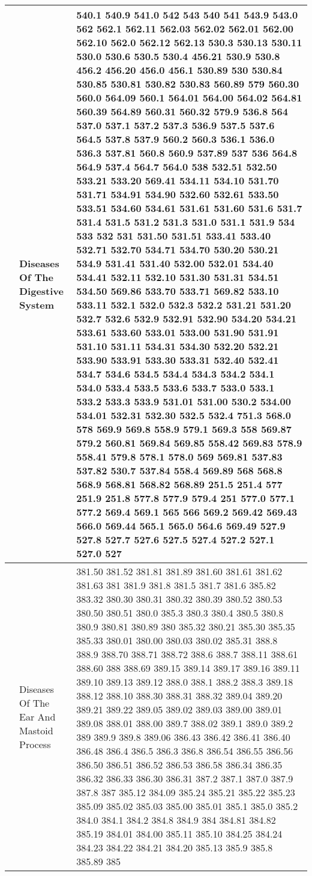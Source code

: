 \begin{longtable}{|R{.05in}|L{.65in}||L{5.65in}|}
    & Diseases Of The Digestive System &  540.1 540.9 541.0 542 543 540 541 543.9 543.0 562 562.1 562.11 562.03 562.02 562.01 562.00 562.10 562.0 562.12 562.13 530.3 530.13 530.11 530.0 530.6 530.5 530.4 456.21 530.9 530.8 456.2 456.20 456.0 456.1 530.89 530 530.84 530.85 530.81 530.82 530.83 560.89 579 560.30 560.0 564.09 560.1 564.01 564.00 564.02 564.81 560.39 564.89 560.31 560.32 579.9 536.8 564 537.0 537.1 537.2 537.3 536.9 537.5 537.6 564.5 537.8 537.9 560.2 560.3 536.1 536.0 536.3 537.81 560.8 560.9 537.89 537 536 564.8 564.9 537.4 564.7 564.0 538 532.51 532.50 533.21 533.20 569.41 534.11 534.10 531.70 531.71 534.91 534.90 532.60 532.61 533.50 533.51 534.60 534.61 531.61 531.60 531.6 531.7 531.4 531.5 531.2 531.3 531.0 531.1 531.9 534 533 532 531 531.50 531.51 533.41 533.40 532.71 532.70 534.71 534.70 530.20 530.21 534.9 531.41 531.40 532.00 532.01 534.40 534.41 532.11 532.10 531.30 531.31 534.51 534.50 569.86 533.70 533.71 569.82 533.10 533.11 532.1 532.0 532.3 532.2 531.21 531.20 532.7 532.6 532.9 532.91 532.90 534.20 534.21 533.61 533.60 533.01 533.00 531.90 531.91 531.10 531.11 534.31 534.30 532.20 532.21 533.90 533.91 533.30 533.31 532.40 532.41 534.7 534.6 534.5 534.4 534.3 534.2 534.1 534.0 533.4 533.5 533.6 533.7 533.0 533.1 533.2 533.3 533.9 531.01 531.00 530.2 534.00 534.01 532.31 532.30 532.5 532.4 751.3 568.0 578 569.9 569.8 558.9 579.1 569.3 558 569.87 579.2 560.81 569.84 569.85 558.42 569.83 578.9 558.41 579.8 578.1 578.0 569 569.81 537.83 537.82 530.7 537.84 558.4 569.89 568 568.8 568.9 568.81 568.82 568.89 251.5 251.4 577 251.9 251.8 577.8 577.9 579.4 251 577.0 577.1 577.2 569.4 569.1 565 566 569.2 569.42 569.43 566.0 569.44 565.1 565.0 564.6 569.49 527.9 527.8 527.7 527.6 527.5 527.4 527.2 527.1 527.0 527\\\hline
    & Diseases Of The Ear And Mastoid Process
  &  381.50 381.52 381.81 381.89 381.60 381.61 381.62 381.63 381 381.9 381.8 381.5 381.7 381.6 385.82 383.32 380.30 380.31 380.32 380.39 380.52 380.53 380.50 380.51 380.0 385.3 380.3 380.4 380.5 380.8 380.9 380.81 380.89 380 385.32 380.21 385.30 385.35 385.33 380.01 380.00 380.03 380.02 385.31 388.8 388.9 388.70 388.71 388.72 388.6 388.7 388.11 388.61 388.60 388 388.69 389.15 389.14 389.17 389.16 389.11 389.10 389.13 389.12 388.0 388.1 388.2 388.3 389.18 388.12 388.10 388.30 388.31 388.32 389.04 389.20 389.21 389.22 389.05 389.02 389.03 389.00 389.01 389.08 388.01 388.00 389.7 388.02 389.1 389.0 389.2 389 389.9 389.8 389.06 386.43 386.42 386.41 386.40 386.48 386.4 386.5 386.3 386.8 386.54 386.55 386.56 386.50 386.51 386.52 386.53 386.58 386.34 386.35 386.32 386.33 386.30 386.31 387.2 387.1 387.0 387.9 387.8 387 385.12 384.09 385.24 385.21 385.22 385.23 385.09 385.02 385.03 385.00 385.01 385.1 385.0 385.2 384.0 384.1 384.2 384.8 384.9 384 384.81 384.82 385.19 384.01 384.00 385.11 385.10 384.25 384.24 384.23 384.22 384.21 384.20 385.13 385.9 385.8 385.89 385

\end{longtable}

